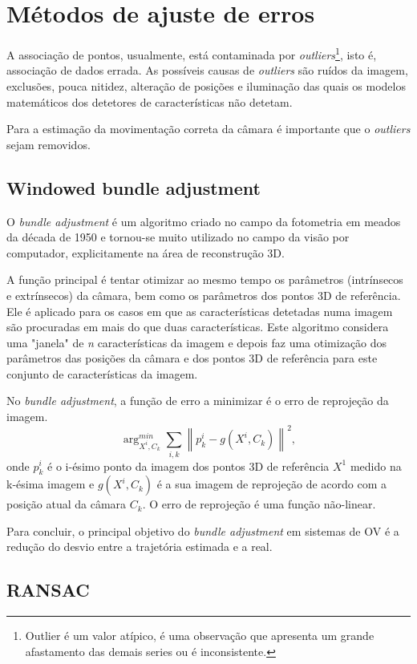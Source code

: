 \section{Métodos de ajuste de erros}

A associação de pontos, usualmente, está contaminada por \textit{outliers}\footnote{Outlier é um valor atípico, é uma observação que apresenta um grande afastamento das demais series ou é inconsistente.}, isto é, associação de dados errada. As possíveis causas de \textit{outliers} são ruídos da imagem, exclusões, pouca nitidez, alteração de posições e iluminação das quais os modelos matemáticos dos detetores de características não detetam. 

Para  a estimação da movimentação correta da câmara é importante que o \textit{outliers} sejam removidos. 

\subsection{Windowed bundle adjustment}

O \textit{bundle adjustment} é um algoritmo criado no campo da fotometria em meados da década de 1950 e tornou-se muito utilizado no campo da visão por computador, explicitamente na área de reconstrução 3D.

A função principal é tentar otimizar ao mesmo tempo os parâmetros (intrínsecos e extrínsecos) da câmara, bem como os parâmetros dos pontos 3D de referência. Ele é aplicado para os casos em que as características detetadas numa imagem são procuradas em mais do que duas características. Este algoritmo considera uma "janela" de \textit{n} características da imagem e depois faz uma otimização dos parâmetros das posições da câmara e dos pontos 3D de referência para este conjunto de características da imagem.

No \textit{bundle adjustment}, a função de erro a minimizar é o erro de reprojeção da imagem. 
\[ \arg_{X^i,C_k}^{min} \sum_{i,k}{\left \| p_k^i - g(X^i,C_k) \right \|}^2,\]
onde $p_k^i$ é o i-ésimo ponto da imagem dos pontos 3D de referência \textit{$X^1$} medido na k-ésima imagem e $\textit{g}(X^i,C_k)$ é a sua imagem de reprojeção de acordo com a posição atual da câmara $C_k$. O erro de reprojeção é uma função não-linear.

Para concluir, o principal objetivo do \textit{bundle adjustment} em sistemas de OV é a redução do desvio entre a trajetória estimada e a real.

\subsection{RANSAC}


